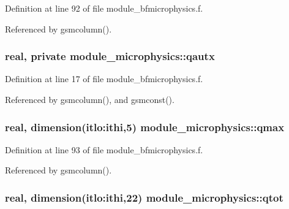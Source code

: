 Definition at line 92 of file module\+\_\+bfmicrophysics.\+f.



Referenced by gsmcolumn().

\subsubsection[{\texorpdfstring{qautx}{qautx}}]{\setlength{\rightskip}{0pt plus 5cm}real, private module\+\_\+microphysics\+::qautx\hspace{0.3cm}{\ttfamily [private]}}\hypertarget{namespacemodule__microphysics_a207d110ab05ae003282c44232b6bb8b1}{}\label{namespacemodule__microphysics_a207d110ab05ae003282c44232b6bb8b1}


Definition at line 17 of file module\+\_\+bfmicrophysics.\+f.



Referenced by gsmcolumn(), and gsmconst().

\subsubsection[{\texorpdfstring{qmax}{qmax}}]{\setlength{\rightskip}{0pt plus 5cm}real, dimension(itlo\+:ithi,5) module\+\_\+microphysics\+::qmax}\hypertarget{namespacemodule__microphysics_ae783e9f9007b2cc25590b9e967461ef7}{}\label{namespacemodule__microphysics_ae783e9f9007b2cc25590b9e967461ef7}


Definition at line 93 of file module\+\_\+bfmicrophysics.\+f.



Referenced by gsmcolumn().

\subsubsection[{\texorpdfstring{qtot}{qtot}}]{\setlength{\rightskip}{0pt plus 5cm}real, dimension(itlo\+:ithi,22) module\+\_\+microphysics\+::qtot}\hypertarget{namespacemodule__microphysics_a1ca8e1d6e01d0b1bfb406608ccfeff5d}{}\label{namespacemodule__microphysics_a1ca8e1d6e01d0b1bfb406608ccfeff5d}


